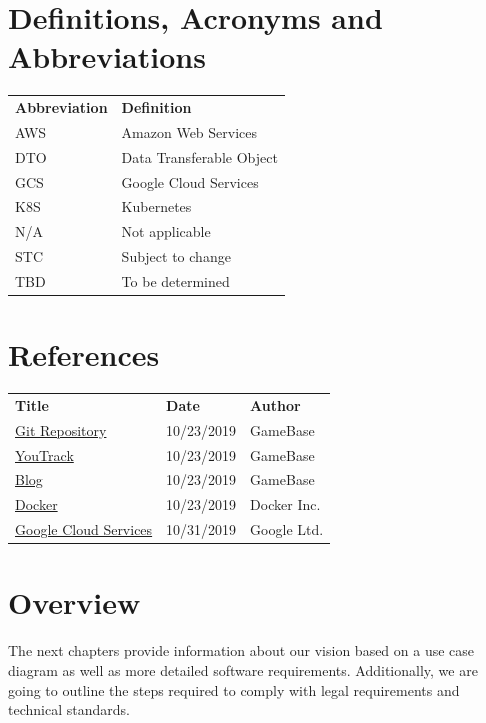 \documentclass[a4paper,12pt,chapterprefix=false,bibliography=totoc,listof=totoc,]{scrreprt}
\begin{document}
\section{Definitions, Acronyms and Abbreviations}
\begin{table}[H]
	\centering
	\everyrow{\hline}
	\begin{tabu} to \textwidth {|X[c]|X[c]|}
		\textbf{Abbreviation} & \textbf{Definition} \\
		AWS & Amazon Web Services \\
		DTO & Data Transferable Object \\
		GCS & Google Cloud Services \\
		K8S & Kubernetes \\
		N/A & Not applicable \\
		STC & Subject to change \\
		TBD & To be determined
	\end{tabu}
	\label{tab:definition-tabview}
\end{table}

\section{References}
\begin{table}[H]
	\centering
	\everyrow{\hline}
	\begin{tabu} to \textwidth {|X[c]|X[c]|X[c]|}
		\textbf{Title} & \textbf{Date} & \textbf{Author} \\
		\href{https://gitlab.tandashi.de/GameBase}{Git Repository} & 10/23/2019 & GameBase \\
		\href{https://youtrack.gahr.dev}{YouTrack} & 10/23/2019 & GameBase \\
		\href{https://gahr.dev}{Blog} & 10/23/2019 & GameBase \\
		\href{https://www.docker.com/}{Docker} & 10/23/2019 & Docker Inc. \\
		\href{https://cloud.google.com/}{Google Cloud Services} & 10/31/2019 & Google Ltd. \\
	\end{tabu}
	\label{tab:references-tabview}
\end{table}

\section{Overview}
The next chapters provide information about our vision based on a use case diagram as well as more detailed software requirements. Additionally, we are going to outline the steps required to comply with legal requirements and technical standards.
\end{document}
